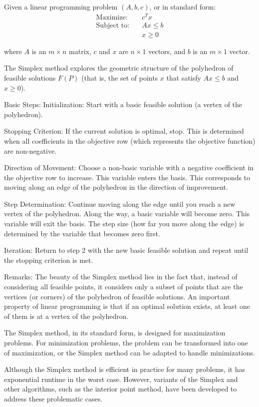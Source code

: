 \documentclass[]{article}
\theoremstyle{definition}
\theoremstyle{definition}
\begin{document}
Given a linear programming problem $(A, b, c)$, or in standard form:
\begin{align*}
\text{Maximize:} \quad & c^T x \\
\text{Subject to:} \quad & Ax \leq b \\
& x \geq 0 
\end{align*}

where $A$ is an $ m \times n $ matrix, $ c $ and $ x $ are $ n \times 1 $ vectors, and $ b $ is an $ m \times 1 $ vector.

The Simplex method explores the geometric structure of the polyhedron of feasible solutions $F(P)$ (that is, the set of points \( x \) that satisfy \( Ax \leq b \) and \( x \geq 0 \)).

Basic Steps:
Initialization: Start with a basic feasible solution (a vertex of the polyhedron).

Stopping Criterion: If the current solution is optimal, stop. This is determined when all coefficients in the objective row (which represents the objective function) are non-negative.

Direction of Movement: Choose a non-basic variable with a negative coefficient in the objective row to increase. This variable enters the basis. This corresponds to moving along an edge of the polyhedron in the direction of improvement.

Step Determination: Continue moving along the edge until you reach a new vertex of the polyhedron. Along the way, a basic variable will become zero. This variable will exit the basis. The step size (how far you move along the edge) is determined by the variable that becomes zero first.

Iteration: Return to step 2 with the new basic feasible solution and repeat until the stopping criterion is met.

Remarks:
The beauty of the Simplex method lies in the fact that, instead of considering all feasible points, it considers only a subset of points that are the vertices (or corners) of the polyhedron of feasible solutions. An important property of linear programming is that if an optimal solution exists, at least one of them is at a vertex of the polyhedron.

The Simplex method, in its standard form, is designed for maximization problems. For minimization problems, the problem can be transformed into one of maximization, or the Simplex method can be adapted to handle minimizations.

Although the Simplex method is efficient in practice for many problems, it has exponential runtime in the worst case. However, variants of the Simplex and other algorithms, such as the interior point method, have been developed to address these problematic cases.
\end{document}
